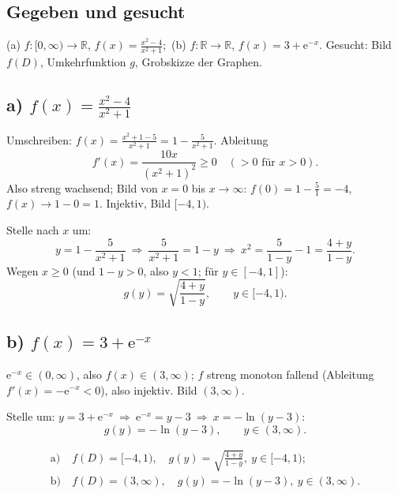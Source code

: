 

\subsection*{Gegeben und gesucht}
(a) $f\colon[0,\infty)\to\mathbb R$, $f(x)=\frac{x^2-4}{x^2+1}$;\
(b) $f\colon\mathbb R\to\mathbb R$, $f(x)=3+\mathrm e^{-x}$.
Gesucht: Bild $f(D)$, Umkehrfunktion $g$, Grobskizze der Graphen.

\subsection*{a) $f(x)=\frac{x^2-4}{x^2+1}$}
Umschreiben: $f(x)=\frac{x^2+1-5}{x^2+1}=1-\frac5{x^2+1}$. Ableitung
\begin{equation}
  f'(x)=\frac{10x}{(x^2+1)^2}\ge0 \quad (\text{$>0$ f\"ur }x>0).
\end{equation}
Also streng wachsend; Bild von $x=0$ bis $x\to\infty$:
$f(0)=1-\frac51=-4$, $f(x)\to1-0=1$. Injektiv, Bild $[-4,1)$.

Stelle nach $x$ um:
\begin{equation}
  y=1-\frac5{x^2+1}\ \Longrightarrow\ \frac5{x^2+1}=1-y\ \Longrightarrow\
  x^2=\frac5{1-y}-1=\frac{4+y}{1-y}.
\end{equation}
Wegen $x\ge0$ (und $1-y>0$, also $y<1$; f\"ur $y\in[-4,1]$):
\begin{equation}
  g(y)=\sqrt{\frac{4+y}{1-y}},\qquad y\in[-4,1).
\end{equation}

\subsection*{b) $f(x)=3+\mathrm e^{-x}$}
$\mathrm e^{-x}\in(0,\infty)$, also $f(x)\in(3,\infty)$; $f$ streng
monoton fallend (Ableitung $f'(x)=-\mathrm e^{-x}<0$), also injektiv.
Bild $(3,\infty)$.

Stelle um: $y=3+\mathrm e^{-x}\ \Rightarrow\ \mathrm e^{-x}=y-3\ \Rightarrow\ x=-\ln(y-3)$:
\begin{equation}
  g(y)=-\ln(y-3),\qquad y\in(3,\infty).
\end{equation}

\begin{ergebnis}
\begin{align*}
  \text{a)}&\ f(D)=[-4,1),\quad g(y)=\sqrt{\tfrac{4+y}{1-y}},\ y\in[-4,1);\\
  \text{b)}&\ f(D)=(3,\infty),\quad g(y)=-\ln(y-3),\ y\in(3,\infty).
\end{align*}
\end{ergebnis}

